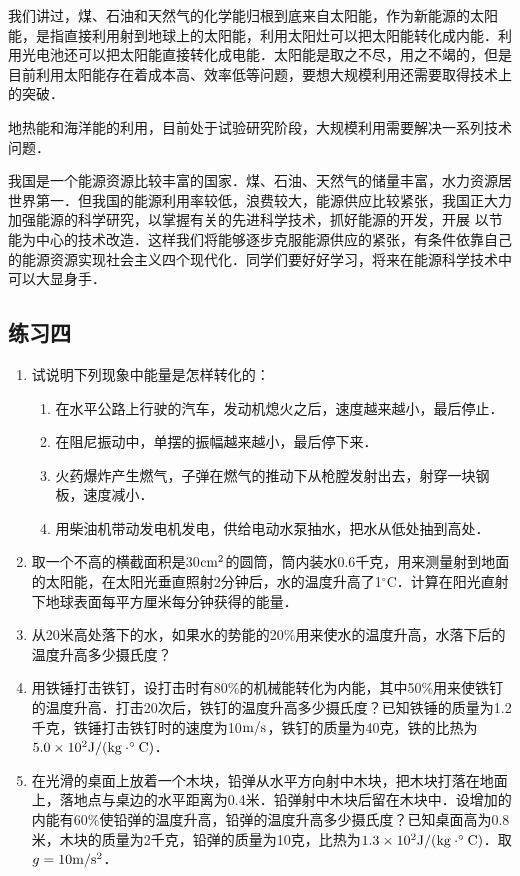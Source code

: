 我们讲过，煤、石油和天然气的化学能归根到底来自太阳能，作为新能源的太阳能，是指直接利用射到地球上的太阳能，利用太阳灶可以把太阳能转化成内能．利用光电池还可以把太阳能直接转化成电能．太阳能是取之不尽，用之不竭的，但是目前利用太阳能存在着成本高、效率低等问题，要想大规模利用还需要取得技术上的突破．

地热能和海洋能的利用，目前处于试验研究阶段，大规模利用需要解决一系列技术问题．

我国是一个能源资源比较丰富的国家．煤、石油、天然气的储量丰富，水力资源居世界第一．但我国的能源利用率较低，浪费较大，能源供应比较紧张，我国正大力加强能源的科学研究，以掌握有关的先进科学技术，抓好能源的开发，开展
以节能为中心的技术改造．这样我们将能够逐步克服能源供应的紧张，有条件依靠自己的能源资源实现社会主义四个现代化．同学们要好好学习，将来在能源科学技术中可以大显身手．

\subsection*{练习四}

\begin{enumerate}
	\item 试说明下列现象中能量是怎样转化的：
	\begin{enumerate}
		\item 在水平公路上行驶的汽车，发动机熄火之后，速度越来越小，最后停止．
		\item 在阻尼振动中，单摆的振幅越来越小，最后停下来．
		\item 火药爆炸产生燃气，子弹在燃气的推动下从枪膛发射出去，射穿一块钢板，速度减小．
		\item 用柴油机带动发电机发电，供给电动水泵抽水，把水从低处抽到高处．
	\end{enumerate}

\item 取一个不高的横截面积是30${\rm cm^2}$的圆筒，筒内装水0.6千克，用来测量射到地面的太阳能，在太阳光垂直照射2分钟后，水的温度升高了1$^\circ$C．计算在阳光直射下地球表面每平方厘米每分钟获得的能量．
\item 从20米高处落下的水，如果水的势能的20\%用来使水的温度升高，水落下后的温度升高多少摄氏度？
\item 用铁锤打击铁钉，设打击时有80\%的机械能转化为内能，其中50\%用来使铁钉的温度升高．打击20次后，铁钉的温度升高多少摄氏度？已知铁锤的质量为1.2千克，铁锤打击铁钉时的速度为10${\rm m/s}$，铁钉的质量为40克，铁的比热为$5.0\times 10^2 {\rm J}/({\rm kg\cdot ^\circ C})$．

\item 在光滑的桌面上放着一个木块，铅弹从水平方向射中木块，把木块打落在地面上，落地点与桌边的水平距离为0.4米．铅弹射中木块后留在木块中．设增加的内能有60\%使铅弹的温度升高，铅弹的温度升高多少摄氏度？已知桌面高为0.8米，木块的质量为2千克，铅弹的质量为10克，比热为$1.3\times 10^2 {\rm J}/({\rm kg\cdot ^\circ C})$．取$g=10{\rm m}/{\rm s^2}$．

\end{enumerate}

